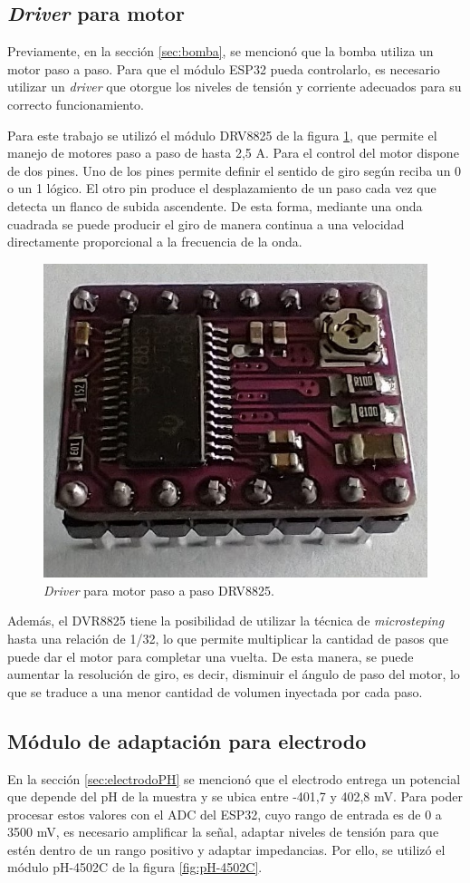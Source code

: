 \subsection{\textit{Driver} para motor}

Previamente, en la sección \ref{sec:bomba}, se mencionó que la bomba utiliza un motor paso a paso. Para que el módulo ESP32 pueda controlarlo, es necesario utilizar un \textit{driver} que otorgue los niveles de tensión y corriente adecuados para su correcto funcionamiento.

Para este trabajo se utilizó el módulo DRV8825 de la figura \ref{fig:DRV8825-Frente}, que permite el manejo de motores paso a paso de hasta 2,5 A. Para el control del motor dispone de dos pines. Uno de los pines permite definir el sentido de giro según reciba un 0 o un 1 lógico. El otro pin produce el desplazamiento de un paso cada vez que detecta un flanco de subida ascendente. De esta forma, mediante una onda cuadrada se puede producir el giro de manera continua a una velocidad directamente proporcional a la frecuencia de la onda.

\begin{figure}[htbp]
	\centering
	\includegraphics[width=.3\textwidth]{./Figures/DRV8825-Frente.jpeg}
	\caption{\textit{Driver} para motor paso a paso DRV8825.}
	\label{fig:DRV8825-Frente}
\end{figure}

Además, el DVR8825 tiene la posibilidad de utilizar la técnica de \textit{microsteping} hasta una relación de 1/32, lo que permite multiplicar la cantidad de pasos que puede dar el motor para completar una vuelta. De esta manera, se puede aumentar la resolución de giro, es decir, disminuir el ángulo de paso del motor, lo que se traduce a una menor cantidad de volumen inyectada por cada paso.

\subsection{Módulo de adaptación para electrodo}

En la sección \ref{sec:electrodoPH} se mencionó que el electrodo entrega un potencial que depende del pH de la muestra y se ubica entre -401,7 y 402,8 mV. Para poder procesar estos valores con el ADC del ESP32, cuyo rango de entrada es de 0 a 3500 mV, es necesario amplificar la señal, adaptar niveles de tensión para que estén dentro de un rango positivo y adaptar impedancias. Por ello, se utilizó el módulo pH-4502C de la figura \ref{fig:pH-4502C}.

